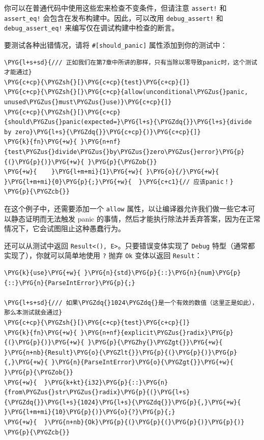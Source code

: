 你可以在普通代码中使用这些宏来检查不变条件，但请注意 \texttt{assert!} 和 \texttt{assert\_eq!} 会包含在发布构建中。因此，可以改用 \texttt{debug\_assert!} 和 \texttt{debug\_assert\_eq!} 来编写仅在调试构建中检查的断言。

要测试各种出错情况，请将 \texttt{\#[should\_panic]} 属性添加到你的测试中：

\begin{Verbatim}[commandchars=\\\{\},breaklines=true,breakanywhere=true,fontsize=\codefont,xleftmargin=17bp]
\PYG{l+s+sd}{/// 正如我们在第7章中所讲的那样，只有当除以零导致panic时，这个测试才能通过}
\PYG{c+cp}{\PYGZsh{}[}\PYG{c+cp}{test}\PYG{c+cp}{]}
\PYG{c+cp}{\PYGZsh{}[}\PYG{c+cp}{allow(unconditional\PYGZus{}panic, unused\PYGZus{}must\PYGZus{}use)}\PYG{c+cp}{]}
\PYG{c+cp}{\PYGZsh{}[}\PYG{c+cp}{should\PYGZus{}panic(expected=}\PYG{l+s}{\PYGZdq{}}\PYG{l+s}{divide by zero}\PYG{l+s}{\PYGZdq{}}\PYG{c+cp}{)}\PYG{c+cp}{]}
\PYG{k}{fn}\PYG{+w}{ }\PYG{n+nf}{test\PYGZus{}divide\PYGZus{}by\PYGZus{}zero\PYGZus{}error}\PYG{p}{(}\PYG{p}{)}\PYG{+w}{ }\PYG{p}{\PYGZob{}}
\PYG{+w}{    }\PYG{l+m+mi}{1}\PYG{+w}{ }\PYG{o}{/}\PYG{+w}{ }\PYG{l+m+mi}{0}\PYG{p}{;}\PYG{+w}{  }\PYG{c+c1}{// 应该panic！}
\PYG{p}{\PYGZcb{}}
\end{Verbatim}

在这个例子中，还需要添加一个 \texttt{allow} 属性，以让编译器允许我们做一些它本可以静态证明而无法触发 panic 的事情，然后才能执行除法并丢弃答案，因为在正常情况下，它会试图阻止这种愚蠢行为。

还可以从测试中返回 \texttt{Result<(), E>}。只要错误变体实现了 \texttt{Debug} 特型（通常都实现了），你就可以简单地使用 \texttt{?} 抛弃 \texttt{Ok} 变体以返回 \texttt{Result}：

\begin{Verbatim}[commandchars=\\\{\},breaklines=true,breakanywhere=true,fontsize=\codefont,xleftmargin=17bp]
\PYG{k}{use}\PYG{+w}{ }\PYG{n}{std}\PYG{p}{::}\PYG{n}{num}\PYG{p}{::}\PYG{n}{ParseIntError}\PYG{p}{;}

\PYG{l+s+sd}{/// 如果\PYGZdq{}1024\PYGZdq{}是一个有效的数值（这里正是如此），那么本测试就会通过}
\PYG{c+cp}{\PYGZsh{}[}\PYG{c+cp}{test}\PYG{c+cp}{]}
\PYG{k}{fn}\PYG{+w}{ }\PYG{n+nf}{explicit\PYGZus{}radix}\PYG{p}{(}\PYG{p}{)}\PYG{+w}{ }\PYG{p}{\PYGZhy{}\PYGZgt{}}\PYG{+w}{ }\PYG{n+nb}{Result}\PYG{o}{\PYGZlt{}}\PYG{p}{(}\PYG{p}{)}\PYG{p}{,}\PYG{+w}{ }\PYG{n}{ParseIntError}\PYG{o}{\PYGZgt{}}\PYG{+w}{ }\PYG{p}{\PYGZob{}}
\PYG{+w}{  }\PYG{k+kt}{i32}\PYG{p}{::}\PYG{n}{from\PYGZus{}str\PYGZus{}radix}\PYG{p}{(}\PYG{l+s}{\PYGZdq{}}\PYG{l+s}{1024}\PYG{l+s}{\PYGZdq{}}\PYG{p}{,}\PYG{+w}{ }\PYG{l+m+mi}{10}\PYG{p}{)}\PYG{o}{?}\PYG{p}{;}
\PYG{+w}{  }\PYG{n+nb}{Ok}\PYG{p}{(}\PYG{p}{(}\PYG{p}{)}\PYG{p}{)}
\PYG{p}{\PYGZcb{}}
\end{Verbatim}

